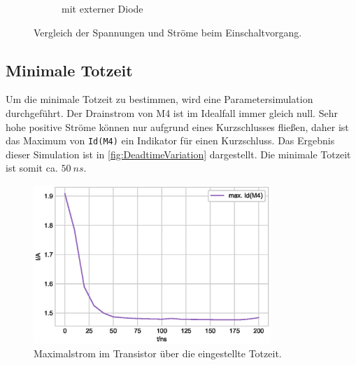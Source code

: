 \begin{figure}
\begin{subfigure}[t]{0.32\textwidth}
         \caption{mit externer Diode}
     \end{subfigure}
        \caption{Vergleich der Spannungen und Ströme beim Einschaltvorgang.}
        \label{fig:three graphs}
\end{figure}
\subsection{Minimale Totzeit}
Um die minimale Totzeit zu bestimmen, wird eine Parametersimulation durchgeführt. Der Drainstrom von M4 ist im Idealfall immer gleich null. Sehr hohe positive Ströme können nur aufgrund eines Kurzschlusses fließen, daher ist das Maximum von \texttt{Id(M4)} ein Indikator für einen Kurzschluss. Das Ergebnis dieser Simulation ist in \autoref{fig:DeadtimeVariation} dargestellt. Die minimale Totzeit ist somit ca. $\SI{50}{ns}$.
\begin{figure}
    \centering
    \includegraphics[width=0.8\textwidth]{Bilder/DeadtimeStepped.eps}
    \caption{Maximalstrom im Transistor über die eingestellte Totzeit.}
    \label{fig:DeadtimeVariation}
\end{figure}


